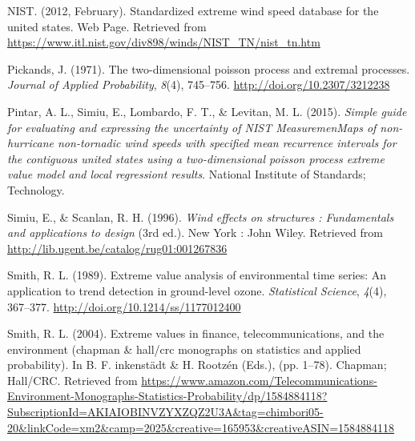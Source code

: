 \documentclass[12pt,oneside]{reedthesis}
\begin{document}
\leavevmode\hypertarget{ref-nist2012}{}%
NIST. (2012, February). Standardized extreme wind speed database for the united states. Web Page. Retrieved from \url{https://www.itl.nist.gov/div898/winds/NIST_TN/nist_tn.htm}

\leavevmode\hypertarget{ref-Pickands1971}{}%
Pickands, J. (1971). The two-dimensional poisson process and extremal processes. \emph{Journal of Applied Probability}, \emph{8}(4), 745--756. \url{http://doi.org/10.2307/3212238}

\leavevmode\hypertarget{ref-Pintar2015}{}%
Pintar, A. L., Simiu, E., Lombardo, F. T., \& Levitan, M. L. (2015). \emph{Simple guide for evaluating and expressing the uncertainty of NIST MeasuremenMaps of non-hurricane non-tornadic wind speeds with specified mean recurrence intervals for the contiguous united states using a two-dimensional poisson process extreme value model and local regressiont results}. National Institute of Standards; Technology.

\leavevmode\hypertarget{ref-Simiu1996}{}%
Simiu, E., \& Scanlan, R. H. (1996). \emph{Wind effects on structures : Fundamentals and applications to design} (3rd ed.). New York : John Wiley. Retrieved from \url{http://lib.ugent.be/catalog/rug01:001267836}

\leavevmode\hypertarget{ref-Smith1989}{}%
Smith, R. L. (1989). Extreme value analysis of environmental time series: An application to trend detection in ground-level ozone. \emph{Statistical Science}, \emph{4}(4), 367--377. \url{http://doi.org/10.1214/ss/1177012400}

\leavevmode\hypertarget{ref-Smith2004}{}%
Smith, R. L. (2004). Extreme values in finance, telecommunications, and the environment (chapman \& hall/crc monographs on statistics and applied probability). In B. F. inkenstädt \& H. Rootzén (Eds.), (pp. 1--78). Chapman; Hall/CRC. Retrieved from \url{https://www.amazon.com/Telecommunications-Environment-Monographs-Statistics-Probability/dp/1584884118?SubscriptionId=AKIAIOBINVZYXZQZ2U3A\&tag=chimbori05-20\&linkCode=xm2\&camp=2025\&creative=165953\&creativeASIN=1584884118}


\end{document}
